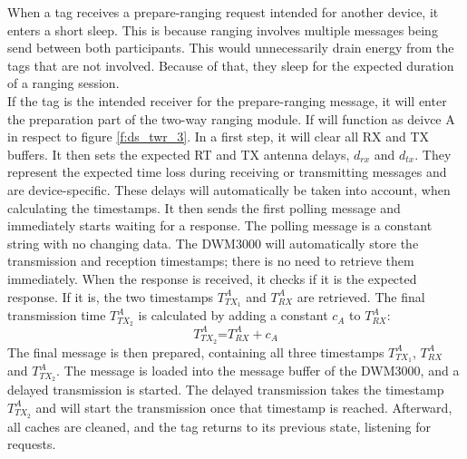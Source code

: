 When a tag receives a prepare-ranging request intended for another device, it enters a short sleep.
This is because ranging involves multiple messages being send between both participants.
This would unnecessarily drain energy from the tags that are not involved.
Because of that, they sleep for the expected duration of a ranging session. \\
If the tag is the intended receiver for the prepare-ranging message, it will enter the preparation part of the two-way ranging module.
If will function as deivce A in respect to figure \ref{f:ds_twr_3}.
In a first step, it will clear all RX and TX buffers.
It then sets the expected RT and TX antenna delays, $d_{rx}$ and $d_{tx}$.
They represent the expected time loss during receiving or transmitting messages and are device-specific.
These delays will automatically be taken into account, when calculating the timestamps.
It then sends the first polling message and immediately starts waiting for a response.
The polling message is a constant string with no changing data.
The DWM3000 will automatically store the transmission and reception timestamps; there is no need to retrieve them immediately.
When the response is received, it checks if it is the expected response.
If it is, the two timestamps $T_{TX_1}^A$ and $T_{RX}^A$ are retrieved.
The final transmission time $T_{TX_2}^A$ is calculated by adding a constant $c_A$ to $T_{RX}^A$:\begin{equation}
	\mbox{$T_{TX_2}^A$=}
	\mbox{$T_{RX}^A+c_A$}
\end{equation}
The final message is then prepared, containing all three timestamps $T_{TX_1}^A$, $T_{RX}^A$ and $T_{TX_2}^A$.
The message is loaded into the message buffer of the DWM3000, and a delayed transmission is started.
The delayed transmission takes the timestamp $T_{TX_2}^A$ and will start the transmission once that timestamp is reached.
Afterward, all caches are cleaned, and the tag returns to its previous state, listening for requests.

